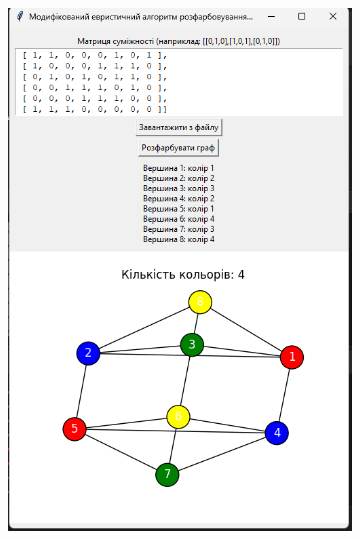 \documentclass[12pt,a4paper]{article}
\begin{document}
\begin{figure}[htbp]
        \begin{subfigure}{0.35\textwidth}
            \includegraphics[width=\linewidth]{ex2.png}
            \label{fig:c}
        \end{subfigure}
        \begin{subfigure}{0.35\textwidth}

\end{subfigure}
\end{figure}
\end{document}
